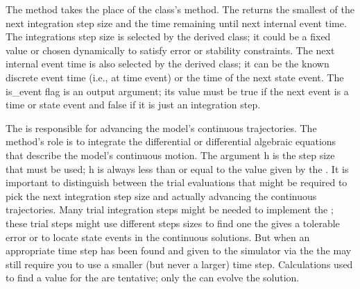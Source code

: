 The  method takes the place of the  class's  method. The  returns the smallest of the next integration step size and the time remaining until next internal event time. The integrations step size is selected by the derived class; it could be a fixed value or chosen dynamically to satisfy error or stability constraints. The next internal event time is also selected by the derived class; it can be the known discrete event time (i.e., at time event) or the time of the next state event. The is\_event flag is an output argument; its value must be true if the next event is a time or state event and false if it is just an integration step. 

The  is responsible for advancing the model's continuous trajectories. The method's role is to integrate the differential or differential algebraic equations that describe the model's continuous motion. The argument h is the step size that must be used; h is always less than or equal to the value given by the . It is important to distinguish between the trial evaluations that might be required to pick the next integration step size and actually advancing the continuous trajectories. Many trial integration steps might be needed to implement the ; these trial steps might use different steps sizes to find one the gives a tolerable error or to locate state events in the continuous solutions. But when an appropriate time step has been found and given to the simulator via the  the  may still require you to use a smaller (but never a larger) time step. Calculations used to find a value for the  are tentative; only the  can evolve the solution.

